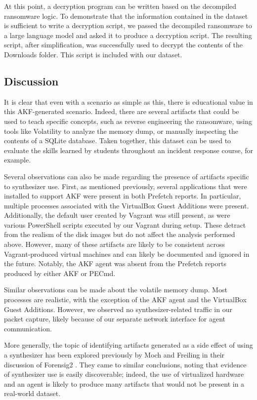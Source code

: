 \documentclass[preprint,12pt]{elsarticle}
\begin{document}
At this point, a decryption program can be written based on the
decompiled ransomware logic. To demonstrate that the information
contained in the dataset is sufficient to write a decryption script, we
passed the decompiled ransomware to a large language model and asked it
to produce a decryption script. The resulting script, after
simplification, was successfully used to decrypt the contents of the
Downloads folder. This script is included with our dataset.

\subsection{Discussion}\label{discussion}

It is clear that even with a scenario as simple as this, there is
educational value in this AKF-generated scenario. Indeed, there are
several artifacts that could be used to teach specific concepts, such as
reverse engineering the ransomware, using tools like Volatility to
analyze the memory dump, or manually inspecting the contents of a SQLite
database. Taken together, this dataset can be used to evaluate the
skills learned by students throughout an incident response course, for
example.

Several observations can also be made regarding the presence of
artifacts specific to synthesizer use. First, as mentioned previously,
several applications that were installed to support AKF were present in
both Prefetch reports. In particular, multiple processes associated with
the VirtualBox Guest Additions were present. Additionally, the default
user created by Vagrant was still present, as were various PowerShell
scripts executed by our Vagrant during setup. These detract from the
realism of the disk images but do not affect the analysis performed
above. However, many of these artifacts are likely to be consistent
across Vagrant-produced virtual machines and can likely be documented
and ignored in the future. Notably, the AKF agent was absent from the
Prefetch reports produced by either AKF or PECmd.

Similar observations can be made about the volatile memory dump. Most
processes are realistic, with the exception of the AKF agent and the
VirtualBox Guest Additions. However, we observed no synthesizer-related
traffic in our packet capture, likely because of our separate network
interface for agent communication.

More generally, the topic of identifying artifacts generated as a side
effect of using a synthesizer has been explored previously by Moch and
Freiling in their discussion of Forensig2
\citep{mochForensicImageGenerator2009,mochEvaluatingForensicImage2012}.
They came to similar conclusions, noting that evidence of synthesizer
use is easily discoverable; indeed, the use of virtualized hardware and
an agent is likely to produce many artifacts that would not be present
in a real-world dataset.
\end{document}
